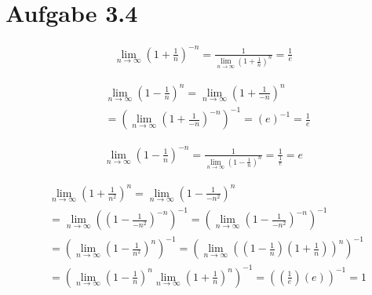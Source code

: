 \documentclass[a4paper,german,12pt,smallheadings]{scrartcl}
\begin{document}
\section*{Aufgabe 3.4}

\begin{align*}
  \lim_{n \to \infty} \left(1+ \frac{1}{n}\right)^{-n} = \frac{1}{\lim_{n \to \infty} \left(1+ \frac{1}{n}\right)^{n}} = \frac{1}{e}
\end{align*}

\begin{align*}
  &\lim_{n \to \infty} \left(1-\frac{1}{n}\right)^n 
  = \lim_{n \to \infty} \left(1+\frac{1}{-n}\right)^n \\
  & =\left(\lim_{n \to \infty} \left(1+\frac{1}{-n}\right)^{-n}\right)^{-1}
  = \left(e\right)^{-1}=\frac{1}{e}
\end{align*}

\begin{align*}
  \lim_{n \to \infty} \left(1- \frac{1}{n}\right)^{-n} 
  = \frac{1}{\lim_{n \to \infty} \left(1- \frac{1}{n}\right)^{n}} 
  = \frac{1}{\frac{1}{e}} = e
\end{align*}

\begin{align*}
  & \lim_{n \to \infty} \left(1 + \frac{1}{n^2}\right)^{n}
   = \lim_{n \to \infty} \left(1 - \frac{1}{-n^2}\right)^{n} \\
  & =\lim_{n \to \infty} \left(\left(1 - \frac{1}{-n^2}\right)^{-n}\right)^{-1}
  = \left(\lim_{n \to \infty} \left(1 - \frac{1}{-n^2}\right)^{-n}\right)^{-1} \\
  & = \left(\lim_{n \to \infty} \left(1 - \frac{1}{n^2}\right)^{n}\right)^{-1} 
  = \left(\lim_{n \to \infty} \left(\left(1 - \frac{1}{n}\right)\left(1 + \frac{1}{n}\right)\right)^{n}\right)^{-1} \\
  & = \left(\lim_{n \to \infty} \left(1 - \frac{1}{n}\right)^{n} \lim_{n \to \infty} \left(1 + \frac{1}{n}\right)^{n}\right)^{-1} 
  = \left(\left(\frac{1}{e}\right)\left(e\right)\right)^{-1} = 1
\end{align*}
\end{document}
